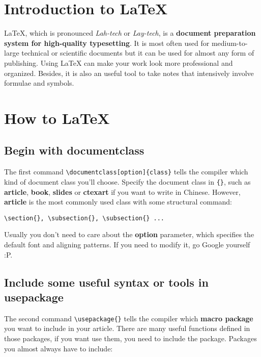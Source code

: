 \documentclass[]{article}
\title{\ttfamily{\LaTeX \;Intro Manual}}
\author{\ttfamily{jan\_chen}}
\date{\ttfamily{September 2023}}
\begin{document}
\maketitle
\tableofcontents

\section{Introduction to \LaTeX}

LaTeX, which is pronounced
\textit{Lah-tech} or \textit{Lay-tech}, is a \textbf{document preparation system for high-quality typesetting}. It is most often used for medium-to-large technical or scientific documents but it can be used for almost any form of publishing. Using LaTeX can make your work look more professional and organized. Besides, it is also an useful tool to take notes that intensively involve formulae and symbols.

\section{How to \LaTeX }

\subsection{Begin with documentclass}
The first command \verb|\documentclass[option]{class}| tells the compiler which kind of document class you'll choose. Specify the document class in \verb|{}|, such as \textbf{article}, \textbf{book}, \textbf{slides} or \textbf{ctexart} if you want to write in Chinese. However, \textbf{article} is the most commonly used class with some structural command:
\begin{lstlisting}[basicstyle = \ttfamily]
\section{}, \subsection{}, \subsection{} ...
\end{lstlisting}
Usually you don't need to care about the \textbf{option} parameter, which specifies the default font and aligning patterns. If you need to modify it, go Google yourself :P.
\subsection{Include some useful syntax or tools in usepackage}
The second command \verb|\usepackage{}| tells the compiler which \textbf{macro package} you want to include in your article. There are many useful functions defined in those packages, if you want use them, you need to include the package. Packages you almost always have to include:
\end{document}

